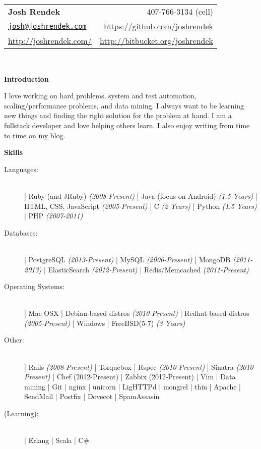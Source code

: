 \documentclass[letterpaper,11pt]{article}
\newcommand{\resheading}[1]{{\large \colorbox{myblue}{\begin{minipage}{\textwidth}{\textbf{#1 \vphantom{p\^{E}}}}\end{minipage}}}}
\begin{document}
\newcommand{\infoheader}{
\begin{tabular*}{7.5in}{l@{\extracolsep{\fill}}r}
\textbf{\LARGE Josh Rendek }  & 407-766-3134 (cell) \\ 
\href{mailto:josh@joshrendek.com}{\nolinkurl{josh@joshrendek.com}} & \url{https://github.com/joshrendek} \\
\url{http://joshrendek.com/} & \url{http://bitbucket.org/joshrendek} \\
\end{tabular*}
\\

\vspace{0.1in}
}

\newcommand{\pagebreakwithheader}{\pagebreak\infoheader}

\infoheader

\resheading{Introduction}
I love working on hard problems, system and test automation, scaling/performance problems, and data mining.
I always want to be learning new things and finding the right solution for the problem at hand. I am a fullstack developer and love helping others learn.
I also enjoy writing from time to time on my blog.
\linebreak

\resheading{Skills}

\begin{description}
    \item[Languages:] \hfill \\
        | Ruby (and JRuby) \textit{(2008-Present)}
        | Java (focus on Android) \textit{(1.5 Years)}
        | HTML, CSS, JavaScript \textit{(2005-Present)}
        | C \textit{(2 Years)}
        | Python \textit{(1.5 Years)}
        | PHP \textit{(2007-2011)}
    \item[Databases:] \hfill  \\
        | PostgreSQL \textit{(2013-Present)}
        | MySQL \textit{(2006-Present)}
        | MongoDB \textit{(2011-2013)}
        | ElasticSearch \textit{(2012-Present)}
        | Redis/Memcached \textit{(2011-Present)}
    \item[Operating Systems:] \hfill \\
        | Mac OSX
        | Debian-based distros \textit{(2010-Present)}
        | Redhat-based distros \textit{(2005-Present)}
        | Windows
        | FreeBSD(5-7) \textit{(3 Years)}
    \item[Other:] \hfill \\
        | Rails \textit{(2008-Present)}
        | Torquebox
        | Rspec \textit{(2010-Present)}
        | Sinatra \textit{(2010-Present)}
        | Chef (2012-Present)
        | Zabbix (2012-Present)
        | Vim
        | Data mining
        | Git
        | nginx
        | unicorn
        | LigHTTPd
        | mongrel
        | thin
        | Apache
        | SendMail
        | Postfix
        | Dovecot
        | SpamAssasin
    \item[(Learning):] \hfill \\
        | Erlang
        | Scala
        | C\#
\end{description}
\end{document}
